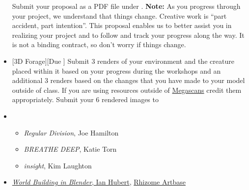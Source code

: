 \begin{itemize}[noitemsep,topsep=0pt,leftmargin=*]
\begin{itemize}
          \end{itemize}
          Submit your proposal as a PDF file under . \newline
          \small{\textbf{Note:} As you progress through your project, we understand that things change. Creative work is ``part accident, part intention''. This proposal enables us to better assist you in realizing your project and to follow and track your progress along the way. It is not a binding contract, so don't worry if things change.}
    \item {}[3D Forage][Due \dSun] Submit 3 renders of your environment and the creature placed within it based on your progress during the workshops and an additional 3 renders based on the changes that you have made to your model outside of class. If you are using resources outside of \href{https://quixel.com/megascans}{Megascans} credit them appropriately. Submit your 6 rendered images to \discordE
    \item {}
          \begin{itemize}
              \item \emph{Regular Division}, Joe Hamilton
              \item \emph{BREATHE DEEP}, Katie Torn
              \item \emph{insight}, Kim Laughton
          \end{itemize}
    \item {} \href{https://www.youtube.com/watch?v=whPWKecazgM}{\emph{World Building in Blender}, Ian Hubert}, \href{https://rhizome.org/art/artbase/}{Rhizome Artbase}
\end{itemize}